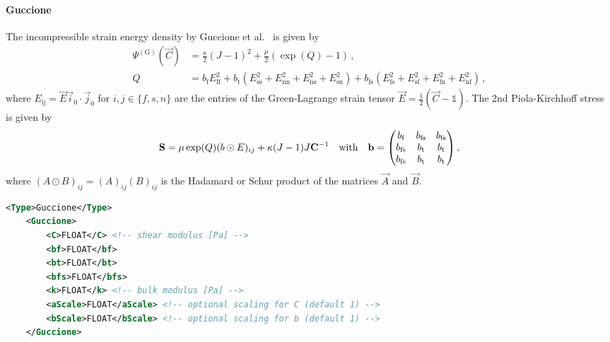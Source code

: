 \paragraph{Guccione}
The incompressible strain energy density by Guccione et al.~\cite{guccione95} is given by
\begin{align}
    \Psi^{(\mathrm{G})} (\vec C) &= \frac{\kappa}{2} (J-1)^2 + \frac{\mu}{2}(\exp(Q) -1) \,, \nonumber\\
    Q &= b_\text{f} E_\text{ff}^2 + 
    b_\text{t} (E_\text{ss}^2 + E_\text{nn}^2 + E_\text{ns}^2 + E_\text{sn}^2) +
    b_\text{fs} (E_\text{fs}^2 + E_\text{sf}^2 + E_\text{fn}^2 + E_\text{nf}^2) \,,\label{eq:guccione}
\end{align}
where $E_\text{ij} = \vec E \vec i_0 \cdot \vec j_0$ for $i,j \in \{f,s,n\}$ are the entries of the Green-Lagrange strain tensor ${\vec E = \frac{1}{2}(\vec C - \mathds{1})}$.
The 2nd Piola-Kirchhoff stress is given by
\begin{equation}
    \vec S = 
    \mu \exp(Q) (b \odot E)_{ij} + \kappa (J-1) J \vec C^{-1} \qq{with} \vec b = 
    \mqty( b_\text{f} &  b_\text{fs} &  b_\text{fs} \\ 
           b_\text{fs} &  b_\text{t} &  b_\text{t} \\ 
           b_\text{fs} &  b_\text{t} &  b_\text{t}) \,,
\end{equation}
where $(A \odot B)_{ij} = (A)_{ij}(B)_{ij}$ is the Hadamard or Schur product of the matrices $\vec A$ and $\vec B$.

\begin{lstlisting}[language=XML,caption=.xml settings for Guccione material]
    <Type>Guccione</Type>
    <Guccione>
        <C>FLOAT</C> <!-- shear modulus [Pa] -->
        <bf>FLOAT</bf>
        <bt>FLOAT</bt>
        <bfs>FLOAT</bfs>
        <k>FLOAT</k> <!-- bulk modulus [Pa] -->
        <aScale>FLOAT</aScale> <!-- optional scaling for C (default 1) -->
        <bScale>FLOAT</bScale> <!-- optional scaling for b (default 1) -->
    </Guccione>
\end{lstlisting}

